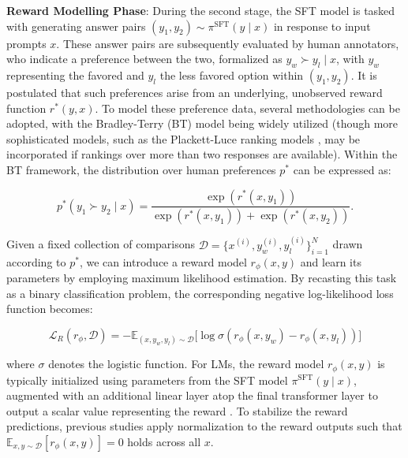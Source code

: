 \textbf{Reward Modelling Phase}: During the second stage, the SFT model is tasked with generating answer pairs $(y_1, y_2)\sim \pi^\text{SFT}(y \mid x)$ in response to input prompts $x$. These answer pairs are subsequently evaluated by human annotators, who indicate a preference between the two, formalized as $y_w\succ y_l \mid x$, with $y_w$ representing the favored and $y_l$ the less favored option within $(y_1, y_2)$. It is postulated that such preferences arise from an underlying, unobserved reward function $r^*(y, x)$. To model these preference data, several methodologies can be adopted, with the Bradley-Terry (BT) model \cite{bradley1952rankanalysis} being widely utilized (though more sophisticated models, such as the Plackett-Luce ranking models \citep{plackett1975analysis, luce2012individual}, may be incorporated if rankings over more than two responses are available). Within the BT framework, the distribution over human preferences $p^*$ can be expressed as:

\begin{equation}\label{eq:bradley-terry}
    p^*(y_1\succ y_2 \mid x)=\frac{\exp\left(r^*(x, y_1)\right)}{\exp\left(r^*(x, y_1)\right) + \exp\left(r^*(x, y_2)\right)}.
\end{equation}

Given a fixed collection of comparisons $\mathcal{D}=\bigl\{x^{(i)}, y_w^{(i)}, y_l^{(i)}\bigr\}_{i=1}^N$ drawn according to $p^*$, we can introduce a reward model $r_{\phi}(x, y)$ and learn its parameters by employing maximum likelihood estimation. By recasting this task as a binary classification problem, the corresponding negative log-likelihood loss function becomes:

\begin{equation}\label{eq:reward_model}
    \mathcal{L}_R(r_{\phi}, \mathcal{D}) = -\mathbb{E}_{(x, y_w, y_l)\sim \mathcal{D}}\bigl[\log \sigma(r_{\phi}(x, y_w)- r_{\phi}(x, y_l))\bigr]
\end{equation}

where $\sigma$ denotes the logistic function. For LMs, the reward model $r_{\phi}(x, y)$ is typically initialized using parameters from the SFT model $\pi^\text{SFT}(y \mid x)$, augmented with an additional linear layer atop the final transformer layer to output a scalar value representing the reward \cite{ziegler2020finetuning}. To stabilize the reward predictions, previous studies apply normalization to the reward outputs such that $\mathbb{E}_{x,y\sim \mathcal{D}}\left[r_\phi(x, y)\right] = 0$ holds across all $x$.

